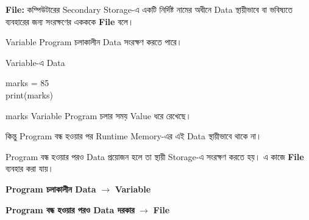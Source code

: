 
\begin{definitionbox}

\textbf{File:}
কম্পিউটারের Secondary Storage-এ একটি নির্দিষ্ট নামের অধীনে
Data স্থায়ীভাবে বা ভবিষ্যতে ব্যবহারের জন্য সংরক্ষণের একককে
\textbf{File} বলে।

\end{definitionbox}

Variable Program চলাকালীন Data সংরক্ষণ করতে পারে।

\begin{codeoutputbox}{Variable-এ Data}

\noindent
\begin{minipage}[t]{0.50\linewidth}
\codeheading

\begin{english}
\ttfamily
marks = 85\\
print(marks)
\end{english}

\end{minipage}
\hfill
\begin{minipage}[t]{0.46\linewidth}
\outputheading

\begin{center}
\textenglish{}
\end{center}

\textenglish{\ttfamily marks}
Variable Program চলার সময় Value ধরে রেখেছে।

কিন্তু Program বন্ধ হওয়ার পর Runtime Memory-এর এই Data
স্থায়ীভাবে থাকে না।

\end{minipage}

\end{codeoutputbox}

Program বন্ধ হওয়ার পরও Data প্রয়োজন হলে তা স্থায়ী Storage-এ
সংরক্ষণ করতে হয়। এ কাজে \textbf{File} ব্যবহার করা যায়।

\begin{rememberbox}

\begin{center}

\textbf{Program চলাকালীন Data}
\(\longrightarrow\)
\textbf{Variable}

\medskip

\textbf{Program বন্ধ হওয়ার পরও Data দরকার}
\(\longrightarrow\)
\textbf{File}

\end{center}

\end{rememberbox}

